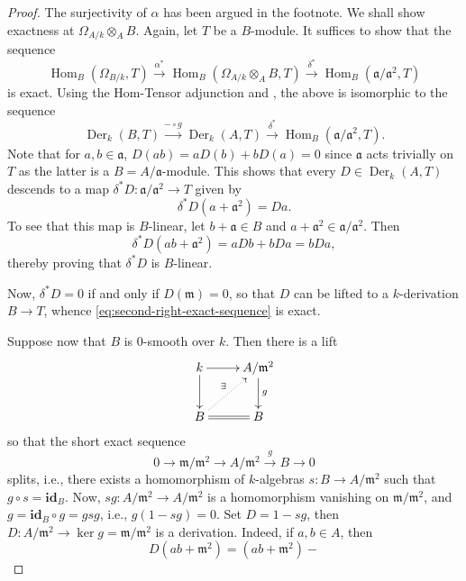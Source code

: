 \documentclass[10pt]{article}
\theoremstyle{thmstyle}
\theoremstyle{defstyle}
\newcommand{\id}{\mathbf{id}}
\newcommand{\Hom}{\operatorname{Hom}}
\newcommand{\fraka}{\mathfrak{a}} %
\newcommand{\frakm}{\mathfrak{m}} %
\newcommand{\Der}{\operatorname{Der}}
\begin{document}
\begin{proof}
    The surjectivity of $\alpha$ has been argued in the footnote. We  shall show exactness at $\Omega_{A/k}\otimes_A B$. Again, let $T$ be a $B$-module. It suffices to show that the sequence 
    \begin{equation*}
        \Hom_B(\Omega_{B/k}, T)\xrightarrow{\alpha^\ast}\Hom_B\left(\Omega_{A/k}\otimes_A B, T\right)\xrightarrow{\delta^\ast}\Hom_B(\fraka/\fraka^2, T)
    \end{equation*}
    is exact. Using the Hom-Tensor adjunction and , the above is isomorphic to the sequence 
    \begin{equation*}
        \Der_k(B, T)\xrightarrow{-\circ g}\Der_k(A, T)\xrightarrow{\delta^\ast}\Hom_B(\fraka/\fraka^2, T).
    \end{equation*}
    Note that for $a, b\in\fraka$, $D(ab) = aD(b) + bD(a) = 0$ since $\fraka$ acts trivially on $T$ as the latter is a $B = A/\fraka$-module. This shows that every $D\in\Der_k(A, T)$ descends to a map $\delta^\ast D\colon \fraka/\fraka^2\to T$ given by 
    \begin{equation*}
        \delta^\ast D(a + \fraka^2) = Da.
    \end{equation*}
    To see that this map is $B$-linear, let $b + \fraka\in B$ and $a + \fraka^2\in\fraka/\fraka^2$. Then 
    \begin{equation*}
        \delta^\ast D\left(ab + \fraka^2\right) = aDb + bDa = bDa,
    \end{equation*}
    thereby proving that $\delta^\ast D$ is $B$-linear.

    Now, $\delta^\ast D = 0$ if and only if $D(\frakm) = 0$, so that $D$ can be lifted to a $k$-derivation $B\to T$, whence \eqref{eq:second-right-exact-sequence} is exact.

    Suppose now that $B$ is $0$-smooth over $k$. Then there is a lift 
    \begin{equation*}
        \xymatrix {
            k\ar[d]\ar[r] & A/\frakm^2\ar[d]^g\\
            B\ar@{=}[r]\ar@{.>}[ru]^\exists & B
        }
    \end{equation*}
    so that the short exact sequence 
    \begin{equation*}
        0\to\frakm/\frakm^2\to A/\frakm^2\xrightarrow{g} B\to 0
    \end{equation*}
    splits, i.e., there exists a homomorphism of $k$-algebras $s\colon B\to A/\frakm^2$ such that $g\circ s = \id_B$. Now, $sg\colon A/\frakm^2\to A/\frakm^2$ is a homomorphism vanishing on $\frakm/\frakm^2$, and $g = \id_B\circ g = gsg$, i.e., $g(1 - sg) = 0$. Set $D = 1 - sg$, then $D\colon A/\frakm^2\to\ker g = \frakm/\frakm^2$ is a derivation. Indeed, if $a, b\in A$, then 
    \begin{equation*}
        D(ab + \frakm^2) = (ab + \frakm^2) - %
    \end{equation*}
\end{proof}
\end{document}
